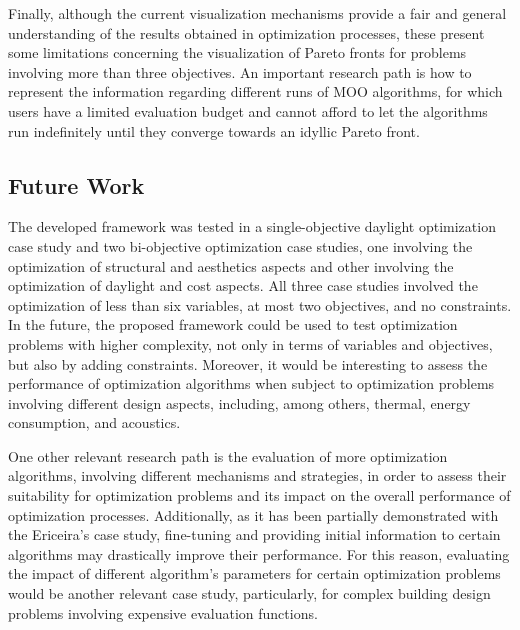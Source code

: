 Finally, although the current visualization mechanisms provide a fair and general understanding of the results obtained in optimization processes, these present some limitations concerning the visualization of Pareto fronts for problems involving more than three objectives. An important research path is how to represent the information regarding different runs of \ac{MOO} algorithms, for which users have a limited evaluation budget and cannot afford to let the algorithms run indefinitely until they converge towards an idyllic Pareto front. %


\subsection{Future Work}
The developed framework was tested in a single-objective daylight optimization case study and two bi-objective optimization case studies, one involving the optimization of structural and aesthetics aspects and other involving the optimization of daylight and cost aspects. All three case studies involved the optimization of less than six variables, at most two objectives, and no constraints. In the future, the proposed framework could be used to test optimization problems with higher complexity, not only in terms of variables and objectives, but also by adding constraints. Moreover, it would be interesting to assess the performance of optimization algorithms when subject to optimization problems involving different design aspects, including, among others, thermal, energy consumption, and acoustics. 
 
One other relevant research path is the evaluation of more optimization algorithms, involving different mechanisms and strategies, in order to assess their suitability for optimization problems and its impact on the overall performance of optimization processes. Additionally, as it has been partially demonstrated with the Ericeira's case study, fine-tuning and providing initial information to certain algorithms may drastically improve their performance. For this reason, evaluating the impact of different algorithm's parameters for certain optimization problems would be another relevant case study, particularly, for complex building design problems involving expensive evaluation functions. 

